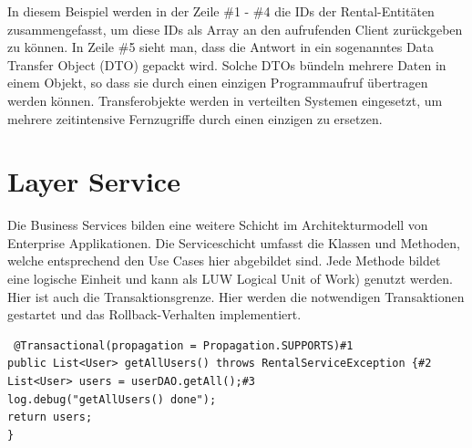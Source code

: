 \documentclass[a4paper,10pt]{scrreprt}
\begin{document}
\begin{description}
\begin{description}
In diesem Beispiel werden in der Zeile \#1 - \#4 die IDs der Rental-Entitäten zusammengefasst, um
diese IDs als Array an den aufrufenden Client zurückgeben zu können. In Zeile \#5 sieht man, dass
die Antwort in ein sogenanntes Data Transfer Object (DTO) gepackt wird. Solche DTOs bündeln
mehrere Daten in einem Objekt, so dass sie durch einen einzigen Programmaufruf übertragen
werden können. Transferobjekte werden in verteilten Systemen eingesetzt, um mehrere
zeitintensive Fernzugriffe durch einen einzigen zu ersetzen.
 \item 
\end{description}
\end{description}
\section{Layer Service}
Die Business Services bilden eine weitere Schicht im Architekturmodell von Enterprise
Applikationen. Die Serviceschicht umfasst die Klassen und Methoden, welche entsprechend den
Use Cases hier abgebildet sind. Jede Methode bildet eine logische Einheit und kann als LUW
Logical Unit of Work) genutzt werden. Hier ist auch die Transaktionsgrenze. Hier werden die
notwendigen Transaktionen gestartet und das Rollback-Verhalten implementiert.
\begin{lstlisting}
 @Transactional(propagation = Propagation.SUPPORTS)#1
public List<User> getAllUsers() throws RentalServiceException {#2
List<User> users = userDAO.getAll();#3
log.debug("getAllUsers() done");
return users;
}
\end{lstlisting}
\end{document}
